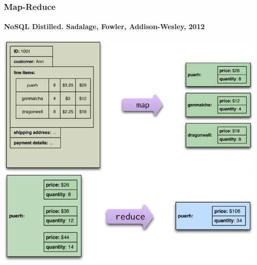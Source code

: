 \documentclass[14pt]{beamer}
\newcommand{\ra}{{\color{blue} $\Rightarrow${}~{}}}
\begin{document}






\begin{frame}[allowframebreaks]
  \frametitle{Map-Reduce}
  \framesubtitle{NoSQL Distilled. Sadalage, Fowler, Addison-Wesley, 2012}
  \includegraphics[width=\textwidth]{img/mapreduce1}
  \framebreak
  \includegraphics[width=\textwidth]{img/mapreduce2}
\end{frame}
\end{document}
